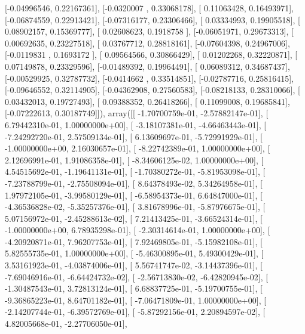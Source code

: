 \documentclass{article}
\begin{document}
       [-0.04996546,  0.22167361],
       [-0.0320007 ,  0.33068178],
       [ 0.11063428,  0.16493971],
       [-0.06874559,  0.22913421],
       [-0.07316177,  0.23306466],
       [ 0.03334993,  0.19905518],
       [ 0.08902157,  0.15369777],
       [ 0.02608623,  0.1918758 ],
       [-0.06051971,  0.29673313],
       [ 0.00692635,  0.23227518],
       [ 0.03767712,  0.28818161],
       [-0.07604398,  0.24967006],
       [-0.0119831 ,  0.1693172 ],
       [ 0.09564566,  0.30866429],
       [ 0.01202268,  0.32220871],
       [ 0.07149878,  0.23329596],
       [-0.01489392,  0.19964491],
       [ 0.06089312,  0.34687437],
       [-0.00529925,  0.32787732],
       [-0.0414662 ,  0.33514851],
       [-0.02787716,  0.25816415],
       [-0.09646552,  0.32114905],
       [-0.04362908,  0.27560583],
       [-0.08218133,  0.28310066],
       [ 0.03432013,  0.19727493],
       [ 0.09388352,  0.26418266],
       [ 0.11099008,  0.19685841],
       [-0.07222613,  0.30187749]]), array([[ -1.70700759e-01,  -2.57882147e-01],
       [  6.79442310e-01,   1.00000000e+00],
       [ -3.18107381e-01,  -4.66463443e-01],
       [ -7.24292720e-01,   2.57509134e-01],
       [  6.13609697e-01,  -5.72991929e-01],
       [ -1.00000000e+00,   2.16030657e-01],
       [ -8.22742389e-01,   1.00000000e+00],
       [  2.12696991e-01,   1.91086358e-01],
       [ -8.34606125e-02,   1.00000000e+00],
       [  4.54515692e-01,  -1.19641131e-01],
       [ -1.70380272e-01,  -5.81953098e-01],
       [ -7.23788799e-01,  -2.75508094e-01],
       [  8.64378493e-02,   5.34264958e-01],
       [  1.97972105e-01,  -3.99580129e-01],
       [ -6.58954373e-01,   6.64847000e-01],
       [ -4.36536828e-02,  -5.35257376e-01],
       [  3.81678996e-01,  -5.87976675e-01],
       [  5.07156972e-01,  -2.45288613e-02],
       [  7.21413425e-01,  -3.66524314e-01],
       [ -1.00000000e+00,   6.78935298e-01],
       [ -2.30314614e-01,   1.00000000e+00],
       [ -4.20920871e-01,   7.96207753e-01],
       [  7.92469805e-01,  -5.15982108e-01],
       [  5.82555735e-01,   1.00000000e+00],
       [ -5.46300895e-01,   5.49300429e-01],
       [  3.53161923e-01,  -4.03874006e-01],
       [  5.56741747e-02,  -3.14437396e-01],
       [ -7.69046916e-01,  -6.64424732e-02],
       [ -2.56713830e-02,  -6.42820945e-02],
       [ -1.30487543e-01,   3.72813124e-01],
       [  6.68837725e-01,  -5.19700755e-01],
       [ -9.36865223e-01,   8.64701182e-01],
       [ -7.06471809e-01,   1.00000000e+00],
       [ -2.14207744e-01,  -6.39572769e-01],
       [ -5.87292156e-01,   2.20894597e-02],
       [  4.82005668e-01,  -2.27706050e-01],
\end{document}

